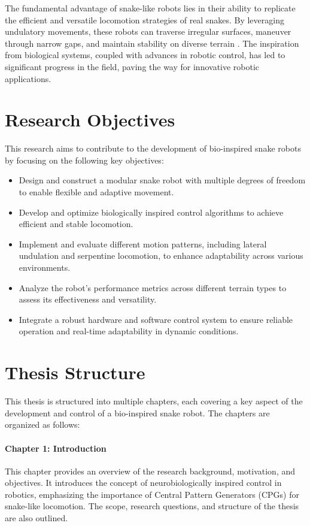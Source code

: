 \documentclass[12pt,a4paper]{report}
\begin{document}
The fundamental advantage of snake-like robots lies in their ability to replicate the efficient and versatile locomotion strategies of real snakes. By leveraging undulatory movements, these robots can traverse irregular surfaces, maneuver through narrow gaps, and maintain stability on diverse terrain \textcite{Seeja2022}. The inspiration from biological systems, coupled with advances in robotic control, has led to significant progress in the field, paving the way for innovative robotic applications.

\section{Research Objectives}
This research aims to contribute to the development of bio-inspired snake robots by focusing on the following key objectives:

\begin{itemize}
    \item Design and construct a modular snake robot with multiple degrees of freedom to enable flexible and adaptive movement.
    \item Develop and optimize biologically inspired control algorithms to achieve efficient and stable locomotion.
    \item Implement and evaluate different motion patterns, including lateral undulation and serpentine locomotion, to enhance adaptability across various environments.
    \item Analyze the robot's performance metrics across different terrain types to assess its effectiveness and versatility.
    \item Integrate a robust hardware and software control system to ensure reliable operation and real-time adaptability in dynamic conditions.
\end{itemize}


\section{Thesis Structure}

This thesis is structured into multiple chapters, each covering a key aspect of the development and control of a bio-inspired snake robot. The chapters are organized as follows:

\paragraph{Chapter 1: Introduction} 
This chapter provides an overview of the research background, motivation, and objectives. It introduces the concept of neurobiologically inspired control in robotics, emphasizing the importance of Central Pattern Generators (CPGs) for snake-like locomotion. The scope, research questions, and structure of the thesis are also outlined.
\end{document}
